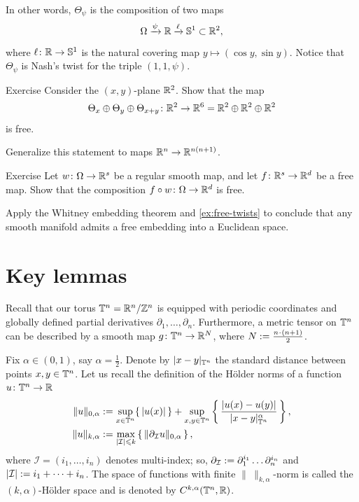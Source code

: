In other words, $\Theta_\psi$ is the composition of two maps
\[\Omega\xrightarrow{\psi}\mathbb{R}\xrightarrow{\ell}\mathbb{S}^1\subset\mathbb{R}^2,\]
where $\ell\colon\mathbb{R}\to\mathbb{S}^1$ is the natural covering map $y\mapsto (\cos y,\sin y)$.
Notice that $\Theta_\psi$ is Nash's twist for the triple $(1,1,\psi)$.

\begin{thm}{Exercise}\label{ex:free-twists}
Consider the $(x,y)$-plane $\mathbb{R}^2$.
Show that the map 
\[\Theta_x\oplus \Theta_y\oplus \Theta_{x+y}\colon\mathbb{R}^2\to \mathbb{R}^6=\mathbb{R}^2\oplus\mathbb{R}^2\oplus\mathbb{R}^2\]
is free.

Generalize this statement to maps $\mathbb{R}^n\to \mathbb{R}^{n(n+1)}$.
\end{thm}

\begin{thm}{Exercise}\label{ex:free-composition}
Let $w\colon\Omega \to \mathbb{R}^s$ be a regular smooth map, and let $f\:\RR^s\z\to \RR^d$ be a free map.
Show that the composition $f\circ w\colon\Omega \to \mathbb{R}^d$ is free.

Apply the Whitney embedding theorem and \ref{ex:free-twists} to conclude that any smooth manifold admits a free embedding into a Euclidean space.
\end{thm}

\section{Key lemmas}

Recall that our torus $\mathbb{T}^n=\mathbb{R}^n/\mathbb{Z}^n$ is equipped with periodic coordinates and globally defined partial derivatives $\partial_1,\dots,\partial_n$.
Furthermore, a metric tensor on $\mathbb{T}^n$ can be described by a smooth map $g\colon\mathbb{T}^n\to\mathbb{R}^N$, where $N\df\frac{n\cdot(n+1)}2$.

Fix $\alpha\in(0,1)$, say $\alpha=\tfrac12$.
Denote by $|x-y|_{\mathbb{T}^n}$ the standard distance between points $x,y\z\in\TT^n$.
Let us recall the definition of the Hölder norms of a function $u\colon\mathbb{T}^n\to \mathbb{R}$
\begin{align*}
\|u\|_{0,\alpha}&\mathrel{:=}\sup_{x\in \mathbb{T}^n}\{\,|u(x)|\,\}+\sup_{x,y\in \mathbb{T}^n}\left\{\,\frac{|u(x)-u(y)|}{|x-y|_{\mathbb{T}^n}^\alpha}\,\right\},
\\
\|u\|_{k,\alpha}&\mathrel{:=}\max_{|\mathcal{I}|\leqslant k}\left\{\,\|\partial_{\mathcal{I}}u\|_{0,\alpha}\,\right\},
\end{align*}
where $\mathcal{I} = (i_1,\dots,i_n)$ denotes multi-index; so, $\partial_{\mathcal{I}}\mathrel{:=} \partial_1^{i_1}\dots\partial_n^{i_n}$ and $|\mathcal{I}| \mathrel{:=} i_1 +\dots+i_n$.
The space of functions with finite $\|\ \|_{k,\alpha}$-norm is called the $(k,\alpha)$-Hölder space and is denoted by $C^{k,\alpha}(\mathbb{T}^n,\mathbb{R})$. 

